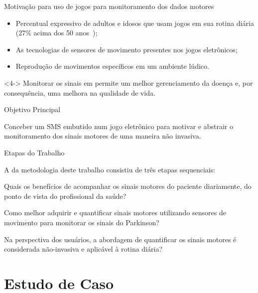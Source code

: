 \documentclass{beamer}
\begin{document}
\begin{frame}{Motivação para uso de jogos para monitoramento dos dados motores}
	\begin{block}{}
	\begin{itemize}[<+->]
	    \item Percentual expressivo de adultos e idosos que usam jogos em sua rotina diária (27\% acima dos 50 anos~\cite{esa2015});
	    \item As tecnologias de sensores de movimento presentes nos jogos eletrônicos;
	    \item Reprodução de movimentos específicos em um ambiente lúdico.
	\end{itemize}
	\end{block}
	
	\begin{alertblock}{}<4->
	Monitorar os sinais em permite um melhor gerenciamento da doença e, por consequência, uma melhora na qualidade de vida.
	\end{alertblock}
\end{frame}


\begin{frame}{Objetivo Principal}
  \begin{block}{}
  Conceber um SMS embutido num jogo eletrônico para motivar e abstrair o monitoramento dos sinais motores de uma maneira não invasiva.
  \end{block}
\end{frame}


\begin{frame}{Etapas do Trabalho}
	\begin{block}{}
	  A da metodologia deste trabalho consistiu de três etapas sequenciais:
		  \begin{description}[<+->]
		  \item[ETAPA 1] Quais os benefícios de acompanhar os sinais motores do paciente diariamente, do ponto de vista do profissional da saúde?
		  \item[ETAPA 2] Como melhor adquirir e quantificar sinais motores utilizando sensores de movimento para monitorar os sinais do Parkinson?
		  \item[ETAPA 3] Na perspectiva dos usuários, a abordagem de quantificar os sinais motores é considerada não-invasiva e aplicável à rotina diária?
		  \end{description}
	\end{block}
\end{frame}


\section{Estudo de Caso}
\end{document}
